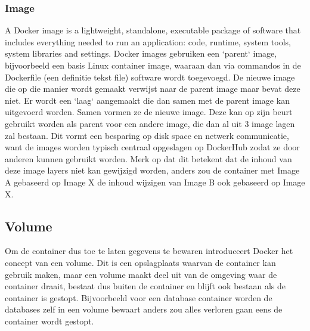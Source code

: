 \subsubsection{Image}
A Docker image is a lightweight, standalone, executable package of software that includes everything needed to run an application: code, runtime, system tools, system libraries and settings.\autocite{Docker2023a}
\newline
\newline
Docker images gebruiken een `parent` image, bijvoorbeeld een basis Linux container image, waaraan dan via commandos in de Dockerfile (een definitie tekst file) software wordt toegevoegd. De nieuwe image die op die manier wordt gemaakt verwijst naar de parent image maar bevat deze niet. Er wordt een `laag` aangemaakt die dan samen met de parent image kan uitgevoerd worden. Samen vormen ze de nieuwe image.
Deze kan op zijn beurt gebruikt worden als parent voor een andere image, die dan al uit 3 image lagen zal bestaan. Dit vormt een besparing op disk space en netwerk communicatie, want de images worden typisch centraal opgeslagen op DockerHub zodat ze door anderen kunnen gebruikt worden.
Merk op dat dit betekent dat de inhoud van deze image layers niet kan gewijzigd worden, anders zou de container met Image A gebaseerd op Image X de inhoud wijzigen van Image B ook gebaseerd op Image X. 

\subsection{Volume}
Om de container dus toe te laten gegevens te bewaren introduceert Docker het concept van een volume. Dit is een opslagplaats waarvan de container kan gebruik maken, maar een volume maakt deel uit van de omgeving waar de container draait, bestaat dus buiten de container en blijft ook bestaan als de container is gestopt. Bijvoorbeeld voor een database container worden de databases zelf in een volume bewaart anders zou alles verloren gaan eens de container wordt gestopt.

